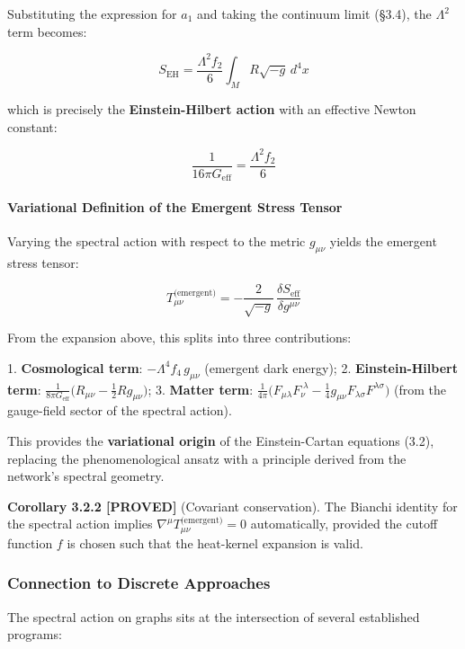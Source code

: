 \documentclass[11pt,a4paper]{article}
\theoremstyle{plain}
\theoremstyle{definition}
\begin{document}
Substituting the expression for $a_1$ and taking the continuum limit (\S3.4), the $\Lambda^2$ term becomes:

$$S_{\text{EH}} = \frac{\Lambda^2 f_2}{6} \int_M R \sqrt{-g} \, d^4x$$

which is precisely the \textbf{Einstein-Hilbert action} with an effective Newton constant:

$$\frac{1}{16\pi G_{\text{eff}}} = \frac{\Lambda^2 f_2}{6}$$

\paragraph{Variational Definition of the Emergent Stress Tensor}

Varying the spectral action with respect to the metric $g_{\mu\nu}$ yields the emergent stress tensor:

$$T^{\text{(emergent)}}_{\mu\nu} = -\frac{2}{\sqrt{-g}} \, \frac{\delta S_{\text{eff}}}{\delta g^{\mu\nu}}$$

From the expansion above, this splits into three contributions:

1. \textbf{Cosmological term}: $-\Lambda^4 f_4 \, g_{\mu\nu}$ (emergent dark energy);
2. \textbf{Einstein-Hilbert term}: $\frac{1}{8\pi G_{\text{eff}}}\bigl(R_{\mu\nu} - \frac{1}{2} R g_{\mu\nu}\bigr)$;
3. \textbf{Matter term}: $\frac{1}{4\pi}\bigl(F_{\mu\lambda} F_{\nu}^{\;\lambda} - \frac{1}{4} g_{\mu\nu} F_{\lambda\sigma} F^{\lambda\sigma}\bigr)$ (from the gauge-field sector of the spectral action).

This provides the \textbf{variational origin} of the Einstein-Cartan equations (3.2), replacing the phenomenological ansatz with a principle derived from the network's spectral geometry.

\textbf{Corollary 3.2.2 \textbf{[PROVED]}} (Covariant conservation). The Bianchi identity for the spectral action implies $\nabla^\mu T^{\text{(emergent)}}_{\mu\nu} = 0$ automatically, provided the cutoff function $f$ is chosen such that the heat-kernel expansion is valid.

\subsubsection{Connection to Discrete Approaches}

The spectral action on graphs sits at the intersection of several established programs:
\end{document}
